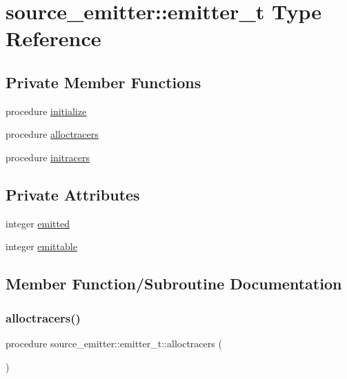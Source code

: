 \hypertarget{structsource__emitter_1_1emitter__t}{}\section{source\+\_\+emitter\+:\+:emitter\+\_\+t Type Reference}
\label{structsource__emitter_1_1emitter__t}
\subsection*{Private Member Functions}
\begin{DoxyCompactItemize}
\item 
procedure \mbox{\hyperlink{structsource__emitter_1_1emitter__t_aed2db993a937e50d5252b41cefcf6e35}{initialize}}
\item 
procedure \mbox{\hyperlink{structsource__emitter_1_1emitter__t_a30562aff6a891e4e2d4836ba833e5b55}{alloctracers}}
\item 
procedure \mbox{\hyperlink{structsource__emitter_1_1emitter__t_ad016a19c24542b2cd39cba9436902305}{initracers}}
\end{DoxyCompactItemize}
\subsection*{Private Attributes}
\begin{DoxyCompactItemize}
\item 
integer \mbox{\hyperlink{structsource__emitter_1_1emitter__t_a30062afe1a31dcfd77c90762d8c8cb5c}{emitted}}
\item 
integer \mbox{\hyperlink{structsource__emitter_1_1emitter__t_acfae676591a37474f44f9c49c1079c98}{emittable}}
\end{DoxyCompactItemize}


\subsection{Member Function/\+Subroutine Documentation}
\mbox{\label{structsource__emitter_1_1emitter__t_a30562aff6a891e4e2d4836ba833e5b55}} 
\subsubsection{\texorpdfstring{alloctracers()}{alloctracers()}}
{\footnotesize\ttfamily procedure source\+\_\+emitter\+::emitter\+\_\+t\+::alloctracers (\begin{DoxyParamCaption}{ }\end{DoxyParamCaption})\hspace{0.3cm}{\ttfamily [private]}}

